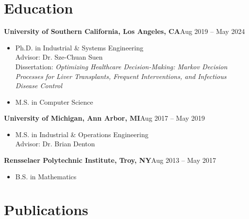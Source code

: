 \documentclass[11pt,letterpaper]{article}
\newcommand{\entry}[2]{\textbf{#1}\hfill #2\par}
\begin{document}
\section{Education}
\entry{University of Southern California, Los Angeles, CA}{Aug 2019 -- May 2024}
\begin{itemize}
  \item Ph.D. in Industrial \& Systems Engineering\\
        Advisor: Dr. Sze-Chuan Suen\\
        Dissertation: \emph{Optimizing Healthcare Decision-Making: Markov Decision Processes for Liver
        Transplants, Frequent Interventions, and Infectious Disease Control}
  \item M.S. in Computer Science
\end{itemize}
\entry{University of Michigan, Ann Arbor, MI}{Aug 2017 -- May 2019}
\begin{itemize}
  \item M.S. in Industrial \& Operations Engineering\\
        Advisor: Dr. Brian Denton
\end{itemize}
\entry{Rensselaer Polytechnic Institute, Troy, NY}{Aug 2013 -- May 2017}
\begin{itemize}
  \item B.S. in Mathematics
\end{itemize}

\section{Publications}
\end{document}
